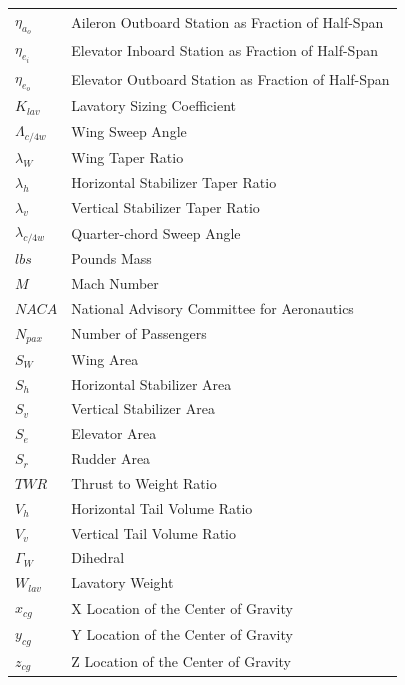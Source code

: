 \documentclass[conf]{new-aiaa}
\begin{document}
{\begin{longtable*}{@{}l @{\quad=\quad} l@{}}
$\eta_{a_o}$               & Aileron Outboard Station as Fraction of Half-Span \\
$\eta_{e_i}$               & Elevator Inboard Station as Fraction of Half-Span \\
$\eta_{e_o}$               & Elevator Outboard Station as Fraction of Half-Span \\
$K_{lav}$                  & Lavatory Sizing Coefficient \\
$\Lambda_{c/4w}$           & Wing Sweep Angle                   \\
$\lambda_W$	               & Wing Taper Ratio                        \\
$\lambda_h$	               & Horizontal Stabilizer Taper Ratio                        \\
$\lambda_v$	               & Vertical Stabilizer Taper Ratio                        \\
$\lambda_{c/4w}$           & Quarter-chord Sweep Angle          \\
$lbs$                      & Pounds Mass \\
$M$                        & Mach Number \\
$NACA$                     & National Advisory Committee for Aeronautics \\
$N_{pax}$                  & Number of Passengers \\
$S_W$     	               & Wing Area                          \\
$S_h$     	               & Horizontal Stabilizer Area \\
$S_v$     	               & Vertical Stabilizer Area  \\
$S_e$     	               & Elevator Area  \\
$S_r$     	               & Rudder Area  \\
$TWR$     	               & Thrust to Weight Ratio             \\
$V_h$     	               & Horizontal Tail Volume Ratio \\
$V_v$     	               & Vertical Tail Volume Ratio \\
$\Gamma_W$	               & Dihedral                           \\
$W_{lav}$	               & Lavatory Weight                           \\
$x_{cg}$	               & X Location of the Center of Gravity \\
$y_{cg}$	               & Y Location of the Center of Gravity \\
$z_{cg}$	               & Z Location of the Center of Gravity \\
\end{longtable*}}
\end{document}
